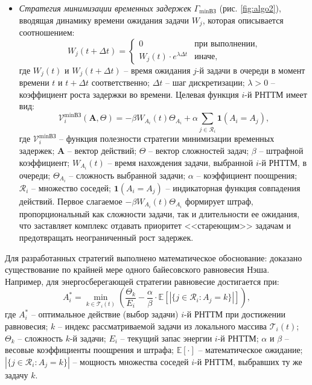 \begin{itemize}[beginpenalty=10000, midpenalty=10000, wide=\parindent, leftmargin=0pt]
    \item \textit{Стратегия минимизации временных задержек}
    $ \Gamma_{\min\text{ВЗ}} $ (рис. \ref{fig:algo2}), вводящая динамику времени ожидания задачи $ W_j $, которая описывается соотношением:
    \begin{equation}
        W_j(t + \Delta t) = \begin{cases} 0 & \text{при выполнении,} \\ W_j(t) \cdot e^{\lambda \Delta t} & \text{иначе,} \end{cases}
    \end{equation}
    где $W_j(t)$ и $W_j(t + \Delta t)$ -- время ожидания $j$-й задачи в очереди в момент времени $t$ и $t+\Delta t$ соответственно; $\Delta t$ -- шаг дискретизации; $\lambda > 0$ -- коэффициент роста задержки во времени. Целевая функция $i$-й РНТТМ имеет вид:
    \begin{equation}
        \mathcal{V}_i^{\min\text{ВЗ}}(\mathbf{A}, \Theta) = -\beta W_{A_i}(t) \Theta_{A_i} +
        \alpha \sum_{j \in \mathcal{R}_i} \mathbf{1}(A_i = A_j),
    \end{equation}
    где $\mathcal{V}_i^{\min\text{ВЗ}}$ -- функция полезности стратегии минимизации временных задержек; $\mathbf{A}$ -- вектор действий; $\Theta$ -- вектор сложностей задач; $\beta$ -- штрафной коэффициент; $W_{A_i}(t)$ -- время нахождения задачи, выбранной $i$-й РНТТМ, в очереди; $\Theta_{A_i}$ -- сложность выбранной задачи; $\alpha$ -- коэффициент поощрения; $\mathcal{R}_i$ -- множество соседей; $\mathbf{1}(A_i = A_j)$ -- индикаторная функция совпадения действий. Первое слагаемое $ -\beta W_{A_i}(t) \Theta_{A_i} $ формирует штраф, пропорциональный как сложности задачи, так и длительности ее ожидания, что заставляет комплекс отдавать приоритет <<стареющим>> задачам и предотвращать неограниченный рост задержек.
\end{itemize}

Для разработанных стратегий выполнено математическое обоснование: доказано существование по крайней мере одного байесовского равновесия Нэша. Например, для энергосберегающей стратегии равновесие достигается при:
\begin{equation}
    A_i^* = \min_{k \in \mathcal{T}_i(t)} \left( \frac{\Theta_k}{E_i} - \frac{\alpha}{\beta} \cdot \mathbb{E}\left[|\{j \in \mathcal{R}_i : A_j = k\}|\right] \right),
\end{equation}
где $A_i^*$ -- оптимальное действие (выбор задачи) $i$-й РНТТМ при достижении равновесия; $k$ -- индекс рассматриваемой задачи из локального массива $\mathcal{T}_i(t)$; $\Theta_k$ -- сложность $k$-й задачи; $E_i$ -- текущий запас энергии $i$-й РНТТМ; $\alpha$ и $\beta$ -- весовые коэффициенты поощрения и штрафа; $\mathbb{E}[\cdot]$ -- математическое ожидание; $|\{j \in \mathcal{R}_i : A_j = k\}|$ -- мощность множества соседей $i$-й РНТТМ, выбравших ту же задачу $k$.

